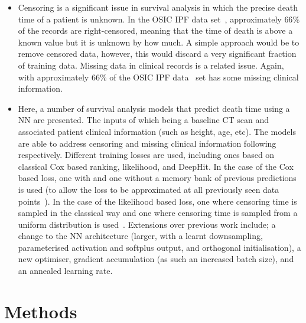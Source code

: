 \documentclass[portrait, color=UCLburgundy, margin=1cm]{uclposter}
\begin{document}
\begin{multicols}{2}
\begin{highlightbox}[UCLlightgreen]
\begin{itemize}
                    \item Censoring is a significant issue in survival analysis in which the precise death time of a patient is unknown. In the \gls{OSIC} \gls{IPF} data set~\cite{OSICOSICRepository}, approximately $66\%$ of the records are right-censored, meaning that the time of death is above a known value but it is unknown by how much. A simple approach would be to remove censored data, however, this would discard a very significant fraction of training data. Missing data in clinical records is a related issue. Again, with approximately $66\%$ of the \gls{OSIC} \gls{IPF} data~\cite{OSICOSICRepository} set has some missing clinical information.
                    
                    \item Here, a number of survival analysis models that predict death time using a \gls{NN} are presented. The inputs of which being a baseline \gls{CT} scan and associated patient clinical information (such as height, age, etc). The models are able to address censoring and missing clinical information following~\cite{Shahin2023DeepAnalysis, Shahin2022SurvivalData} respectively. Different training losses are used, including ones based on classical Cox based ranking, likelihood, and DeepHit. In the case of the Cox based loss, one with and one without a memory bank of previous predictions is used (to allow the loss to be approximated at all previously seen data points~\cite{Shahin2022SurvivalData}). In the case of the likelihood based loss, one where censoring time is sampled in the classical way and one where censoring time is sampled from a uniform distribution is used~\cite{Shahin2023DeepAnalysis}. Extensions over previous work include; a change to the \gls{NN} architecture (larger, with a learnt downsampling, parameterised activation and softplus output, and orthogonal initialisation), a new optimiser, gradient accumulation (as such an increased batch size), and an annealed learning rate.
                \end{itemize}
            \end{highlightbox}

        \section*{Methods}

\end{multicols}
\end{document}
